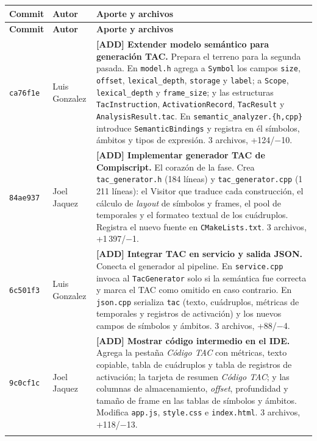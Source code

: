 \documentclass[11pt,a4paper]{article}
\begin{document}
\begin{longtable}{@{}p{1.6cm}L{2.7cm}L{9.1cm}@{}}
\toprule
\textbf{Commit} & \textbf{Autor} & \textbf{Aporte y archivos} \\
\midrule
\endfirsthead
\toprule
\textbf{Commit} & \textbf{Autor} & \textbf{Aporte y archivos} \\
\midrule
\endhead

\texttt{ca76f1e} & Luis Gonzalez &
\textbf{[ADD] Extender modelo semántico para generación TAC.} Prepara el
terreno para la segunda pasada. En \texttt{model.h} agrega a \texttt{Symbol} los
campos \texttt{size}, \texttt{offset}, \texttt{lexical\_depth},
\texttt{storage} y \texttt{label}; a \texttt{Scope}, \texttt{lexical\_depth} y
\texttt{frame\_size}; y las estructuras \texttt{TacInstruction},
\texttt{ActivationRecord}, \texttt{TacResult} y \texttt{AnalysisResult.tac}. En
\texttt{semantic\_analyzer.\{h,cpp\}} introduce \texttt{SemanticBindings} y
registra en él símbolos, ámbitos y tipos de expresión. 3 archivos, +124/$-$10. \\
\addlinespace

\texttt{84ae937} & Joel Jaquez &
\textbf{[ADD] Implementar generador TAC de Compiscript.} El corazón de la fase.
Crea \texttt{tac\_generator.h} (184 líneas) y \texttt{tac\_generator.cpp}
(1\,211 líneas): el Visitor que traduce cada construcción, el cálculo de
\emph{layout} de símbolos y frames, el pool de temporales y el formateo textual
de los cuádruplos. Registra el nuevo fuente en \texttt{CMakeLists.txt}.
3 archivos, +1\,397/$-$1. \\
\addlinespace

\texttt{6c501f3} & Luis Gonzalez &
\textbf{[ADD] Integrar TAC en servicio y salida JSON.} Conecta el generador al
pipeline. En \texttt{service.cpp} invoca al \texttt{TacGenerator} solo si la
semántica fue correcta y marca el TAC como omitido en caso contrario. En
\texttt{json.cpp} serializa \texttt{tac} (texto, cuádruplos, métricas de
temporales y registros de activación) y los nuevos campos de símbolos y ámbitos.
3 archivos, +88/$-$4. \\
\addlinespace

\texttt{9c0cf1c} & Joel Jaquez &
\textbf{[ADD] Mostrar código intermedio en el IDE.} Agrega la pestaña
\emph{Código TAC} con métricas, texto copiable, tabla de cuádruplos y tabla de
registros de activación; la tarjeta de resumen \emph{Código TAC}; y las
columnas de almacenamiento, \emph{offset}, profundidad y tamaño de frame en las
tablas de símbolos y ámbitos. Modifica \texttt{app.js}, \texttt{style.css} e
\texttt{index.html}. 3 archivos, +118/$-$13. \\
\addlinespace


\end{longtable}
\end{document}
